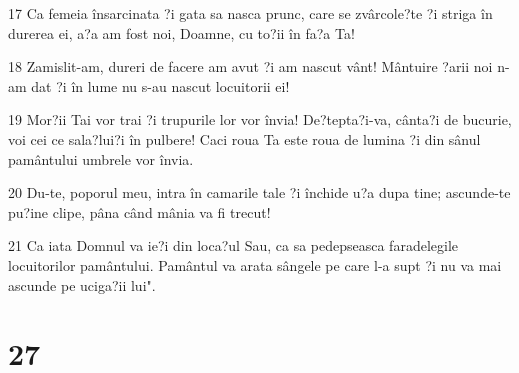 \par 17 Ca femeia însarcinata ?i gata sa nasca prunc, care se zvârcole?te ?i striga în durerea ei, a?a am fost noi, Doamne, cu to?ii în fa?a Ta!
\par 18 Zamislit-am, dureri de facere am avut ?i am nascut vânt! Mântuire ?arii noi n-am dat ?i în lume nu s-au nascut locuitorii ei!
\par 19 Mor?ii Tai vor trai ?i trupurile lor vor învia! De?tepta?i-va, cânta?i de bucurie, voi cei ce sala?lui?i în pulbere! Caci roua Ta este roua de lumina ?i din sânul pamântului umbrele vor învia.
\par 20 Du-te, poporul meu, intra în camarile tale ?i închide u?a dupa tine; ascunde-te pu?ine clipe, pâna când mânia va fi trecut!
\par 21 Ca iata Domnul va ie?i din loca?ul Sau, ca sa pedepseasca faradelegile locuitorilor pamântului. Pamântul va arata sângele pe care l-a supt ?i nu va mai ascunde pe uciga?ii lui".

\chapter{27}

